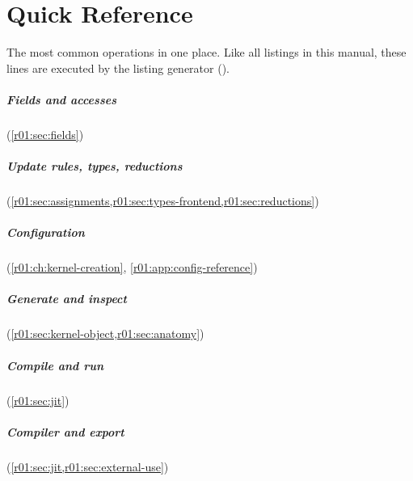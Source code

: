\chapter{Quick Reference}\label{r01:app:quick-reference}

The most common operations in one place. Like all listings in this manual, these
lines are executed by the listing generator ().

\paragraph{Fields and accesses} (\cref{r01:sec:fields})

\paragraph{Update rules, types, reductions} (\cref{r01:sec:assignments,r01:sec:types-frontend,r01:sec:reductions})

\paragraph{Configuration} (\cref{r01:ch:kernel-creation}, \cref{r01:app:config-reference})

\paragraph{Generate and inspect} (\cref{r01:sec:kernel-object,r01:sec:anatomy})

\paragraph{Compile and run} (\cref{r01:sec:jit})

\paragraph{Compiler and export} (\cref{r01:sec:jit,r01:sec:external-use})
